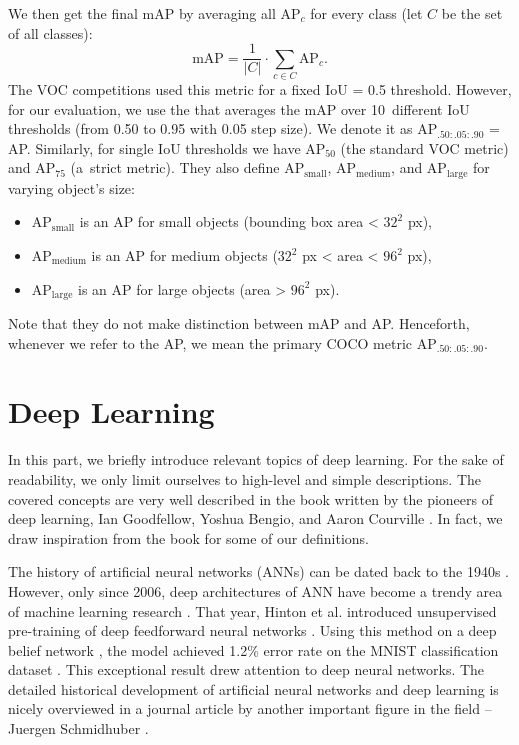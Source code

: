 We then get the final mAP by averaging all AP$_c$ for every class (let $C$ be
the set of all classes):
$$
    \text{mAP} = \frac{1}{\lvert C \rvert} \cdot \sum_{ c\in C} \text{AP}_c.
$$
The VOC competitions \cite{voc} used this metric for a fixed IoU = 0.5 threshold.
However, for our evaluation, we use the 
\cite{coco} that averages the mAP over 10~different IoU thresholds (from 0.50
to 0.95 with 0.05 step size). We denote it as AP$_{.50:.05:.90}$ = AP.
Similarly, for single IoU thresholds we have AP$_{50}$ (the standard VOC metric)
and AP$_{75}$ (a~strict metric). They also define AP$_\text{small}$,
AP$_\text{medium}$, and AP$_\text{large}$ for varying object's size:
\begin{itemize}
    \item AP$_\text{small}$ is an AP for small objects (bounding box area <
          $32^2$ px),
    \item AP$_\text{medium}$ is an AP for medium objects ($32^2$ px < area <
          $96^2$ px),
    \item AP$_\text{large}$ is an AP for large objects (area > $96^2$ px).
\end{itemize}
Note that they do not make distinction between mAP and AP. Henceforth, whenever
we refer to the AP, we mean the primary COCO metric AP$_{.50:.05:.90}$.

\section{Deep Learning}\label{deep_learning_chapter}
In this part, we briefly introduce relevant topics of deep learning. For the
sake of readability, we only limit ourselves to high-level and simple
descriptions. The covered concepts are very well described in the book written
by the pioneers of deep learning, Ian Goodfellow, Yoshua Bengio, and Aaron
Courville \cite{Goodfellow-et-al-2016}. In fact, we draw inspiration from the
book for some of our definitions.

The history of artificial neural networks (ANNs) can be dated back to the 1940s
\cite{McCulloch_1943}. However, only since 2006, deep architectures of ANN have
become a trendy area of machine learning research
\cite{DBLP:journals/corr/Schmidhuber14}. That year, Hinton et al. introduced
unsupervised pre-training of deep feedforward neural networks
\cite{hinton2006reducing}. Using this method on a deep belief network
\cite{DBN}, the model achieved 1.2\% error rate on the MNIST classification
dataset \cite{hinton2006fast, mnist}. This exceptional result drew attention
to deep neural networks. The detailed historical development of artificial
neural networks and deep learning is nicely overviewed in a journal article by
another important figure in the field -- Juergen Schmidhuber
\cite{DBLP:journals/corr/Schmidhuber14}.


